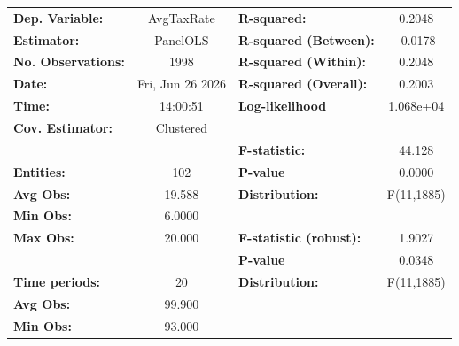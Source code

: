\begin{center}
\begin{tabular}{lclc}
\toprule
\textbf{Dep. Variable:}                            &     AvgTaxRate     & \textbf{  R-squared:         }   &      0.2048      \\
\textbf{Estimator:}                                &      PanelOLS      & \textbf{  R-squared (Between):}  &     -0.0178      \\
\textbf{No. Observations:}                         &        1998        & \textbf{  R-squared (Within):}   &      0.2048      \\
\textbf{Date:}                                     &  Fri, Jun 26 2026  & \textbf{  R-squared (Overall):}  &      0.2003      \\
\textbf{Time:}                                     &      14:00:51      & \textbf{  Log-likelihood     }   &    1.068e+04     \\
\textbf{Cov. Estimator:}                           &     Clustered      & \textbf{                     }   &                  \\
\textbf{}                                          &                    & \textbf{  F-statistic:       }   &      44.128      \\
\textbf{Entities:}                                 &        102         & \textbf{  P-value            }   &      0.0000      \\
\textbf{Avg Obs:}                                  &       19.588       & \textbf{  Distribution:      }   &    F(11,1885)    \\
\textbf{Min Obs:}                                  &       6.0000       & \textbf{                     }   &                  \\
\textbf{Max Obs:}                                  &       20.000       & \textbf{  F-statistic (robust):} &      1.9027      \\
\textbf{}                                          &                    & \textbf{  P-value            }   &      0.0348      \\
\textbf{Time periods:}                             &         20         & \textbf{  Distribution:      }   &    F(11,1885)    \\
\textbf{Avg Obs:}                                  &       99.900       & \textbf{                     }   &                  \\
\textbf{Min Obs:}                                  &       93.000       & \textbf{                     }   &                  \\

\end{tabular}
\end{center}
